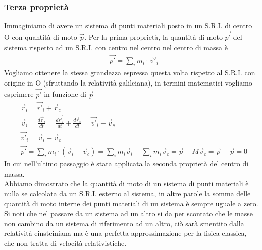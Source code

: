 \documentclass[10pt,a4paper]{article}
\begin{document}
\subsubsection{Terza proprietà}
Immaginiamo di avere un sistema di punti materiali posto in un S.R.I. di centro O con quantità di moto $\vec{p}$. Per la prima proprietà, la quantità di moto $\vec{p'}$ del sistema rispetto ad un S.R.I. con centro nel centro nel centro di massa è
\begin{align*}
&\vec{p'} = \sum_{i}m_i \cdot \vec{v}'_i
\end{align*}
Vogliamo ottenere la stessa grandezza espressa questa volta rispetto al S.R.I. con origine in O (sfruttando la relatività galileiana), in termini matematici vogliamo esprimere $\vec{p'}$ in funzione di $\vec{p}$\\
\begin{align*}
&\vec{r}_i =\vec{r'}_i+\vec{r}_c\\
&\vec{v}_i=\frac{d\vec{r}_i}{dt}=\frac{d\vec{r'}_i}{dt}+\frac{d\vec{r}_c}{dt}=\vec{v'}_i+\vec{v}_c\\
&\vec{v'}_i=\vec{v}_i-\vec{v}_c\\
&\vec{p'}=\sum_{i}m_i\cdot (\vec{v}_i-\vec{v}_c)= \sum_{i}m_i\vec{v}_i - \sum_{i}m_i\vec{v}_c = \vec{p} - M \vec{v}_c=\vec{p}-\vec{p}=0
\end{align*}
In cui nell'ultimo passaggio è stata applicata la seconda proprietà del centro di massa.\\
Abbiamo dimostrato che la quantità di moto di un sistema di punti materiali è nulla se calcolata da un S.R.I. esterno al sistema, in altre parole la somma delle quantità di moto interne dei punti materiali di un sistema è sempre uguale a zero.
Si noti che nel passare da un sistema ad un altro si da per scontato che le masse non cambino da un sistema di riferimento ad un altro, ciò sarà smentito dalla relatività einsteiniana ma è una perfetta approssimazione per la fisica classica, che non tratta di velocità relativistiche.\\
\end{document}
